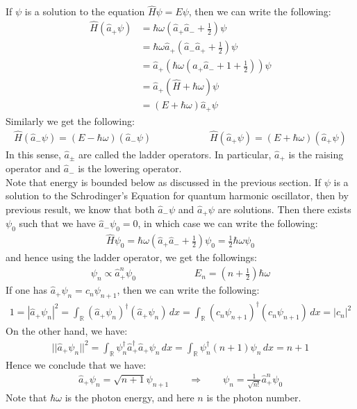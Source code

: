 \documentclass[11pt]{book}
\theoremstyle{break}
\theoremstyle{break}
\newcommand{\R}{\mathbb{R}}
\begin{document}
If $\psi$ is a solution to the equation $\hat{H}\psi = E\psi$, then we can write the following:
\begin{align*}
\hat{H}(\hat{a}_+ \psi) &= \hbar \omega \left(\hat{a}_+ \hat{a}_- +\frac{1}{2}\right) \psi \\
&= \hbar \omega \hat{a}_+ \left( \hat{a}_- \hat{a}_+ +\frac{1}{2}\right) \psi \\
&= \hat{a}_+\left( \hbar \omega \left( \hat{a}_+\hat{a}_-+1+\frac{1}{2}\right)\right) \psi\\
&= \hat{a}_+ \left( \hat{H}+\hbar \omega\right) \psi \\
&= (E+\hbar \omega)\hat{a}_+ \psi
\end{align*}
Similarly we get the following:
\begin{align*}
\hat{H}( \hat{a}_- \psi) = (E-\hbar \omega) (\hat{a}_- \psi)\qquad\qquad\qquad \hat{H}( \hat{a}_+ \psi) = (E+\hbar \omega) (\hat{a}_+\psi)
\end{align*}
In this sense, $\hat{a}_{\pm}$ are called the ladder operators. In particular, $\hat{a}_+$ is the raising operator and $\hat{a}_-$ is the lowering operator.\\



Note that energy is bounded below as discussed in the previous section.
If $\psi$ is a solution to the Schrodinger's Equation for quantum harmonic oscillator, then by previous result, we know that both $\hat{a}_-\psi$ and $\hat{a}_+\psi$ are solutions. Then there exists $\psi_0$ such that we have $\hat{a}_- \psi_0 = 0$, in which case we can write the following:
\begin{align*}
\hat{H}\psi_0 =\hbar\omega\left( \hat{a}_+\hat{a}_- +\frac{1}{2}\right)\psi_0 =\frac{1}{2}\hbar \omega \psi_0
\end{align*}
and hence using the ladder operator, we get the followings:
\begin{align*}
\psi_n \propto \hat{a}_+^n \psi_0 \qquad\qquad\qquad E_n = \left( n + \frac{1}{2}\right) \hbar \omega
\end{align*}
If one has $\hat{a}_+ \psi_n = c_n \psi_{n+1}$, then we can write the following:
\begin{align*}
1 = |\hat{a}_+ \psi_n |^2 = \int_\R (\hat{a}_+ \psi_n)^\dagger (\hat{a}_+ \psi_n) \,dx = \int_\R (c_n \psi_{n+1})^\dagger (c_n \psi_{n+1})\, dx = |c_n|^2
\end{align*}
On the other hand, we have:
\begin{align*}
||\hat{a}_+ \psi_n ||^2  = \int_\R \psi_n^\dagger \hat{a}_+^\dagger \hat{a}_+ \psi_n \, dx = \int_\R \psi_n^\dagger (n+1)\psi_n\, dx = n+1
\end{align*}
Hence we conclude that we have:
\begin{align*}
\hat{a}_+ \psi_n = \sqrt{n+1} \psi_{n+1} \qquad \Rightarrow \qquad \psi_n = \frac{1}{\sqrt{n!}}\hat{a}_+^{n}\psi_0
\end{align*}
Note that $\hbar \omega $ is the photon energy, and here $n$ is the photon number. \\
\end{document}
